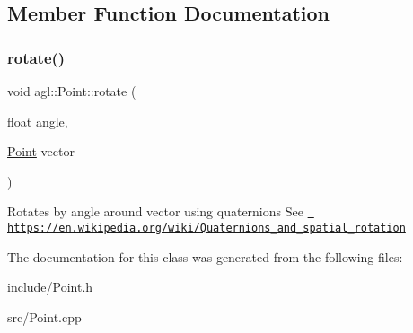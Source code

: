 \subsection{Member Function Documentation}
\mbox{\label{classagl_1_1Point_a2fd5848bb72d952cd6e73b0255a5ebb2}} 
\subsubsection{\texorpdfstring{rotate()}{rotate()}}
{\footnotesize\ttfamily void agl\+::\+Point\+::rotate (\begin{DoxyParamCaption}\item[{float}]{angle,  }\item[{\mbox{\hyperlink{classagl_1_1Point}{Point}}}]{vector }\end{DoxyParamCaption})}

Rotates by angle around vector using quaternions See \href{https://en.wikipedia.org/wiki/Quaternions_and_spatial_rotation}{\texttt{ https\+://en.\+wikipedia.\+org/wiki/\+Quaternions\+\_\+and\+\_\+spatial\+\_\+rotation}} 

The documentation for this class was generated from the following files\+:\begin{DoxyCompactItemize}
\item 
include/Point.\+h\item 
src/Point.\+cpp\end{DoxyCompactItemize}
